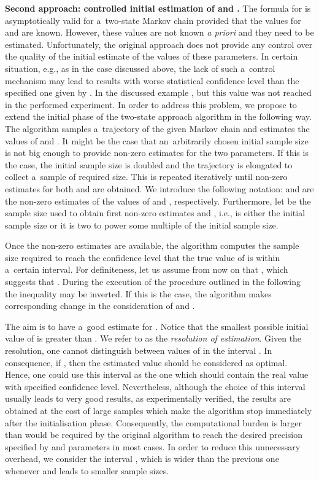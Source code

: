 \documentclass[runningheads,a4paper]{llncs}
\begin{document}
\medskip
\noindent
{\bf Second approach: controlled initial estimation of  and .}
The formula for  is asymptotically valid for a~two-state Markov chain provided that the values
for  and  are known. However, these values are not known \emph{a priori} and they
need to be estimated. Unfortunately, the original approach does not provide any control over the
quality of the initial estimate of the values of these parameters. In certain situation, e.g., as
in the case discussed above, the lack of such a~control mechanism may lead to results with worse
statistical confidence level than the specified one given by . In the discussed example
, but this value was not reached in the performed experiment. In order to address this
problem, we propose to extend the initial phase of the two-state approach algorithm in the
following way. The algorithm samples a~trajectory of the given Markov chain and estimates the
values of  and . It might be the case that an~arbitrarily chosen initial sample
size is not big enough to provide non-zero estimates for the two parameters. If this is the case,
the initial sample size is doubled and the trajectory is elongated to collect a~sample of required
size. This is repeated iteratively until non-zero estimates for both  and  are
obtained. We introduce the following notation:  and  are the non-zero
estimates of the values of  and , respectively. Furthermore, let  be the
sample size used to obtain first non-zero estimates  and , i.e., 
is either the initial sample size or it is two to power some multiple of the initial sample size.

Once the non-zero estimates are available, the algorithm computes the sample size required to
reach the  confidence level that the true value of  is within
a~certain interval. For definiteness, let us assume from now on that ,
which suggests that . During the execution of the procedure outlined in
the following the inequality may be inverted. If this is the case, the algorithm makes 
corresponding change in the consideration of  and .

The aim is to have a~good estimate for . Notice that the smallest possible initial value
of  is greater than . We refer to  as the
\emph{resolution of estimation}. Given the resolution, one cannot distinguish between values of
 in the interval . In
consequence, if , then the
estimated value  should be considered as optimal. Hence, one could use this interval
as the one which should contain the real value with specified confidence level. Nevertheless,
although the choice of this interval usually leads to very good results, as experimentally
verified, the results are obtained at the cost of large samples which make the algorithm stop
immediately after the initialisation phase. Consequently, the computational burden is larger than
would be required by the original algorithm to reach the desired precision specified by  and
 parameters in most cases. In order to reduce this unnecessary overhead, we consider the
interval , which is
wider than the previous one whenever  and leads to smaller sample
sizes.
\end{document}
